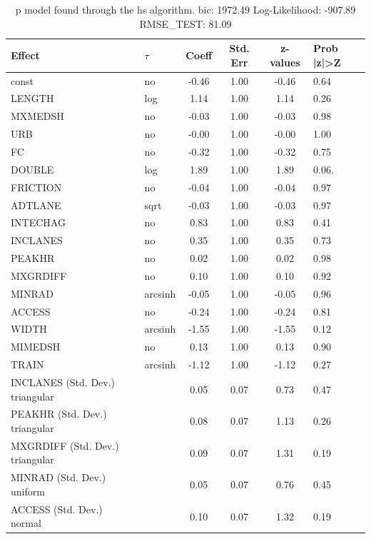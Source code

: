 \begin{table}
	\caption{p model found through the hs algorithm. bic: 1972.49 Log-Likelihood: -907.89 RMSE_TEST: 81.09}
	\begin{center}
		\begin{tabular}{|l|l|c|c|c|l|}
			\hline
			Effect & $\tau$ & Coeff & Std. Err & z-values & Prob |z|>Z \\
			\hline
			const & no & -0.46 & 1.00 & -0.46 & 0.64 \\
			\hline
			LENGTH & log & 1.14 & 1.00 & 1.14 & 0.26 \\
			\hline
			MXMEDSH & no & -0.03 & 1.00 & -0.03 & 0.98 \\
			\hline
			URB & no & -0.00 & 1.00 & -0.00 & 1.00 \\
			\hline
			FC & no & -0.32 & 1.00 & -0.32 & 0.75 \\
			\hline
			DOUBLE & log & 1.89 & 1.00 & 1.89 & 0.06. \\
			\hline
			FRICTION & no & -0.04 & 1.00 & -0.04 & 0.97 \\
			\hline
			ADTLANE & sqrt & -0.03 & 1.00 & -0.03 & 0.97 \\
			\hline
			INTECHAG & no & 0.83 & 1.00 & 0.83 & 0.41 \\
			\hline
			INCLANES & no & 0.35 & 1.00 & 0.35 & 0.73 \\
			\hline
			PEAKHR & no & 0.02 & 1.00 & 0.02 & 0.98 \\
			\hline
			MXGRDIFF & no & 0.10 & 1.00 & 0.10 & 0.92 \\
			\hline
			MINRAD & arcsinh & -0.05 & 1.00 & -0.05 & 0.96 \\
			\hline
			ACCESS & no & -0.24 & 1.00 & -0.24 & 0.81 \\
			\hline
			WIDTH & arcsinh & -1.55 & 1.00 & -1.55 & 0.12 \\
			\hline
			MIMEDSH & no & 0.13 & 1.00 & 0.13 & 0.90 \\
			\hline
			TRAIN & arcsinh & -1.12 & 1.00 & -1.12 & 0.27 \\
			\hline
			INCLANES (Std. Dev.) triangular &  & 0.05 & 0.07 & 0.73 & 0.47 \\
			\hline
			PEAKHR (Std. Dev.) triangular &  & 0.08 & 0.07 & 1.13 & 0.26 \\
			\hline
			MXGRDIFF (Std. Dev.) triangular &  & 0.09 & 0.07 & 1.31 & 0.19 \\
			\hline
			MINRAD (Std. Dev.) uniform &  & 0.05 & 0.07 & 0.76 & 0.45 \\
			\hline
			ACCESS (Std. Dev.) normal &  & 0.10 & 0.07 & 1.32 & 0.19 \\

\end{tabular}
\end{center}
\end{table}
